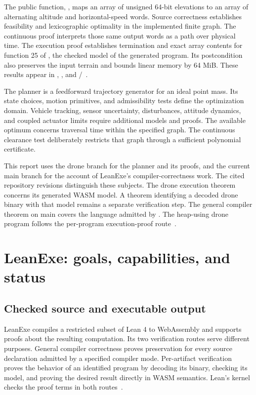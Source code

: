 \documentclass[11pt]{article}
\begin{document}
The public function, , maps an array of unsigned 64-bit elevations to an array of alternating altitude and horizontal-speed words.  Source correctness establishes feasibility and lexicographic optimality in the implemented finite graph.  The continuous proof interprets those same output words as a path over physical time.  The execution proof establishes termination and exact array contents for function 25 of , the checked model of the generated program.  Its postcondition also preserves the input terrain and bounds linear memory by 64 MiB.  These results appear in , , and /~\cite{drone-source,drone-proofs}.

The planner is a feedforward trajectory generator for an ideal point mass.  Its state choices, motion primitives, and admissibility tests define the optimization domain.  Vehicle tracking, sensor uncertainty, disturbances, attitude dynamics, and coupled actuator limits require additional models and proofs.  The available optimum concerns traversal time within the specified graph.  The continuous clearance test deliberately restricts that graph through a sufficient polynomial certificate.

This report uses the drone branch for the planner and its proofs, and the current main branch for the account of LeanExe's compiler-correctness work.  The cited repository revisions distinguish these subjects.  The drone execution theorem concerns its generated WASM model.  A theorem identifying a decoded drone binary with that model remains a separate verification step.  The general compiler theorem on main covers the language admitted by .  The heap-using drone program follows the per-program execution-proof route~\cite{drone-record,compiler-correctness}.

\section{LeanExe: goals, capabilities, and status}
\label{sec:leanexe}

\subsection{Checked source and executable output}

LeanExe compiles a restricted subset of Lean 4 to WebAssembly and supports proofs about the resulting computation.  Its two verification routes serve different purposes.  General compiler correctness proves preservation for every source declaration admitted by a specified compiler mode.  Per-artifact verification proves the behavior of an identified program by decoding its binary, checking its model, and proving the desired result directly in WASM semantics.  Lean's kernel checks the proof terms in both routes~\cite{lean,leanexe-main,compiler-correctness}.
\end{document}
